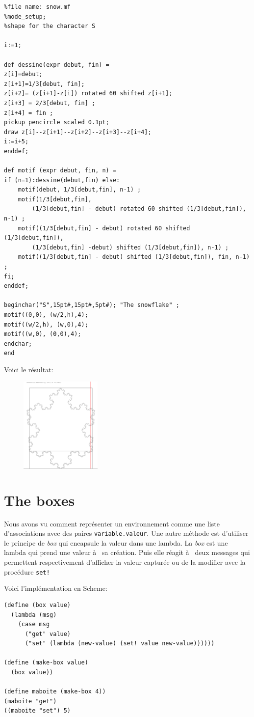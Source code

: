 \begin{Verbatim}
%file name: snow.mf
%mode_setup;
%shape for the character S

i:=1;

def dessine(expr debut, fin) =
z[i]=debut;
z[i+1]=1/3[debut, fin];
z[i+2]= (z[i+1]-z[i]) rotated 60 shifted z[i+1];
z[i+3] = 2/3[debut, fin] ;
z[i+4] = fin ;  
pickup pencircle scaled 0.1pt;
draw z[i]--z[i+1]--z[i+2]--z[i+3]--z[i+4];
i:=i+5;
enddef;

def motif (expr debut, fin, n) =
if (n=1):dessine(debut,fin) else: 
	motif(debut, 1/3[debut,fin], n-1) ;
	motif(1/3[debut,fin],
		(1/3[debut,fin] - debut) rotated 60 shifted (1/3[debut,fin]), n-1) ;
	motif((1/3[debut,fin] - debut) rotated 60 shifted (1/3[debut,fin]),
		(1/3[debut,fin] -debut) shifted (1/3[debut,fin]), n-1) ;
	motif((1/3[debut,fin] - debut) shifted (1/3[debut,fin]), fin, n-1) ;
fi;
enddef;

beginchar("S",15pt#,15pt#,5pt#); "The snowflake" ;
motif((0,0), (w/2,h),4);
motif((w/2,h), (w,0),4);
motif((w,0), (0,0),4);
endchar;
end
\end{Verbatim}

Voici le résultat:
\begin{figure}[H]
	\centering
	\caption{\snow}
	\includegraphics[width=4.0cm]{snow.png}
\end{figure}

\section{The boxes}
Nous avons vu comment représenter un environnement comme une liste
d'associations avec des paires \verb+variable.valeur+.
Une autre méthode est d'utiliser le principe de \textit{box} qui encapsule la
valeur dans une lambda. La \textit{box} est une lambda qui prend une valeur à  sa
création. Puis elle réagit à  deux messages qui permettent respectivement
d'afficher la valeur capturée ou de la modifier avec la procédure \verb+set!+


Voici l'implémentation en Scheme:
\begin{Verbatim}
(define (box value)
  (lambda (msg)
    (case msg
      ("get" value)
      ("set" (lambda (new-value) (set! value new-value))))))

(define (make-box value)
  (box value))

(define maboite (make-box 4))
(maboite "get")
((maboite "set") 5)
\end{Verbatim}

